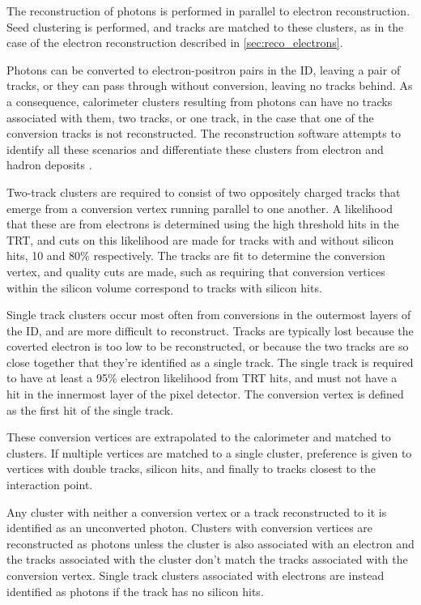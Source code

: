 The reconstruction of photons is performed in parallel to electron reconstruction. Seed clustering is performed, and tracks are matched to these clusters, as in the case of the electron reconstruction described in \autoref{sec:reco_electrons}. 

Photons can be converted to electron-positron pairs in the \ac{ID}, leaving a pair of tracks, or they can pass through without conversion, leaving no tracks behind. As a consequence, calorimeter clusters resulting from photons can have no tracks associated with them, two tracks, or one track, in the case that one of the conversion tracks is not reconstructed. The reconstruction software attempts to identify all these scenarios and differentiate these clusters from electron and hadron deposits \cite{1606.01813}.

Two-track clusters are required to consist of two oppositely charged tracks that emerge from a conversion vertex running parallel to one another. A likelihood that these are from electrons is determined using the high threshold hits in the \ac{TRT}, and cuts on this likelihood are made for tracks with and without silicon hits, 10 and 80\% respectively. The tracks are fit to determine the conversion vertex, and quality cuts are made, such as requiring that conversion vertices within the silicon volume correspond to tracks with silicon hits. 

Single track clusters occur most often from conversions in the outermost layers of the \ac{ID}, and are more difficult to reconstruct. Tracks are typically lost because the coverted electron is too low \pt to be reconstructed, or because the two tracks are so close together that they're identified as a single track. The single track is required to have at least a 95\% electron likelihood from \ac{TRT} hits, and must not have a hit in the innermost layer of the pixel detector. The conversion vertex is defined as the first hit of the single track. 

These conversion vertices are extrapolated to the calorimeter and matched to clusters. If multiple vertices are matched to a single cluster, preference is given to vertices with double tracks, silicon hits, and finally to tracks closest to the interaction point. 

Any cluster with neither a conversion vertex or a track reconstructed to it is identified as an unconverted photon. Clusters with conversion vertices are reconstructed as photons unless the cluster is also associated with an electron and the tracks associated with the cluster don't match the tracks associated with the conversion vertex. Single track clusters associated with electrons are instead identified as photons if the track has no silicon hits. 

